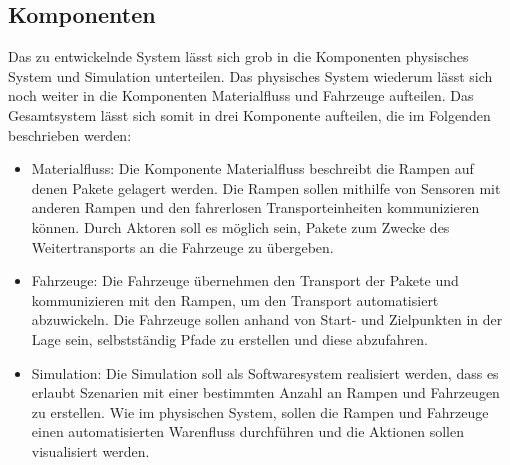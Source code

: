 \subsection{Komponenten}
Das zu entwickelnde System lässt sich grob in die Komponenten physisches System und Simulation unterteilen. Das physisches System wiederum lässt sich noch weiter in die Komponenten Materialfluss und Fahrzeuge aufteilen. Das Gesamtsystem lässt sich somit in drei Komponente aufteilen, die im Folgenden beschrieben werden:

\begin{itemize}
\item Materialfluss: Die Komponente Materialfluss beschreibt die Rampen auf denen Pakete gelagert werden. Die Rampen sollen mithilfe von Sensoren mit anderen Rampen und den fahrerlosen Transporteinheiten kommunizieren können. Durch Aktoren soll es möglich sein, Pakete zum Zwecke des Weitertransports an die Fahrzeuge zu übergeben.
\item Fahrzeuge: Die Fahrzeuge übernehmen den Transport der Pakete und kommunizieren mit den Rampen, um den Transport automatisiert abzuwickeln. Die Fahrzeuge sollen anhand von Start- und Zielpunkten in der Lage sein, selbstständig Pfade zu erstellen und diese abzufahren.
\item Simulation: Die Simulation soll als Softwaresystem realisiert werden, dass es erlaubt Szenarien mit einer bestimmten Anzahl an Rampen und Fahrzeugen zu erstellen. Wie im physischen System, sollen die Rampen und Fahrzeuge einen automatisierten Warenfluss durchführen und die Aktionen sollen visualisiert werden.  
\end{itemize} 
